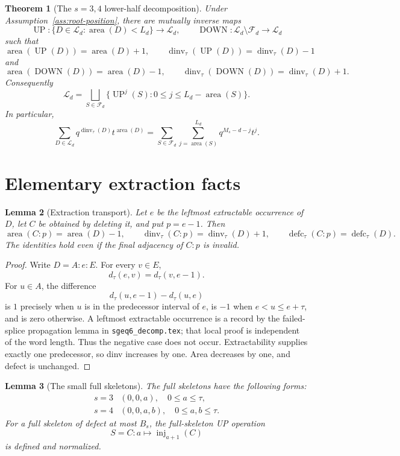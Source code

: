 \documentclass[11pt]{article}
\newtheorem{theorem}{Theorem}[section]
\newtheorem{lemma}[theorem]{Lemma}
\theoremstyle{definition}
\theoremstyle{remark}
\newcommand{\area}{\operatorname{area}}
\newcommand{\dinv}{\operatorname{dinv}}
\newcommand{\defc}{\operatorname{defc}}
\newcommand{\UP}{\operatorname{UP}}
\newcommand{\DOWN}{\operatorname{DOWN}}
\newcommand{\inj}{\operatorname{inj}}
\begin{document}
\begin{theorem}[The $s=3,4$ lower-half decomposition]
\label{thm:main}
Under Assumption~\ref{ass:root-position}, there are mutually inverse maps
\[
 \UP:\{D\in\mathcal L_d:\area(D)<L_d\}\longrightarrow\mathcal L_d,
 \qquad
 \DOWN:\mathcal L_d\setminus\mathcal F_d\longrightarrow\mathcal L_d
\]
such that
\[
 \area(\UP(D))=\area(D)+1,\qquad
 \dinv_\tau(\UP(D))=\dinv_\tau(D)-1
\]
and
\[
 \area(\DOWN(D))=\area(D)-1,\qquad
 \dinv_\tau(\DOWN(D))=\dinv_\tau(D)+1.
\]
Consequently
\begin{equation}
 \mathcal L_d
 =\bigsqcup_{S\in\mathcal F_d}
   \{\UP^j(S):0\le j\le L_d-\area(S)\}.
 \label{eq:lower-union}
\end{equation}
In particular,
\begin{equation}
 \sum_{D\in\mathcal L_d}q^{\dinv_\tau(D)}t^{\area(D)}
 =
 \sum_{S\in\mathcal F_d}
 \sum_{j=\area(S)}^{L_d}q^{M_s-d-j}t^j.
 \label{eq:lower-gf}
\end{equation}
\end{theorem}

\section{Elementary extraction facts}

\begin{lemma}[Extraction transport]
\label{lem:transport}
Let $e$ be the leftmost extractable occurrence of $D$, let $C$ be obtained
by deleting it, and put $p=e-1$.  Then
\[
 \area(C:p)=\area(D)-1,\qquad
 \dinv_\tau(C:p)=\dinv_\tau(D)+1,\qquad
 \defc_\tau(C:p)=\defc_\tau(D).
\]
The identities hold even if the final adjacency of $C:p$ is invalid.
\end{lemma}

\begin{proof}
Write $D=A:e:E$.  For every $v\in E$,
\[
 d_\tau(e,v)=d_\tau(v,e-1).
\]
For $u\in A$, the difference
\[
 d_\tau(u,e-1)-d_\tau(u,e)
\]
is $1$ precisely when $u$ is in the predecessor interval of $e$, is $-1$
when $e<u\le e+\tau$, and is zero otherwise.  A leftmost extractable
occurrence is a record by the failed-splice propagation lemma in
\texttt{sgeq6\_decomp.tex}; that local proof is independent of the word
length.  Thus the negative case does not occur.  Extractability supplies
exactly one predecessor, so dinv increases by one.  Area decreases by one,
and defect is unchanged.
\end{proof}

\begin{lemma}[The small full skeletons]
\label{lem:full-classification}
The full skeletons have the following forms:
\[
 \begin{array}{c|c}
 s=3&(0,0,a),\quad 0\le a\le\tau,\\[1mm]
 s=4&(0,0,a,b),\quad 0\le a,b\le\tau.
 \end{array}
\]
For a full skeleton of defect at most $B_s$, the full-skeleton UP operation
\begin{equation}
 S=C:a\longmapsto\inj_{a+1}(C)
 \label{eq:full-up}
\end{equation}
is defined and normalized.
\end{lemma}
\end{document}
